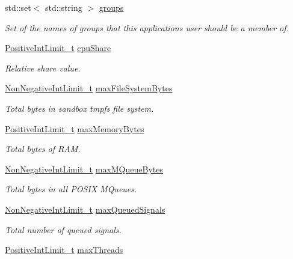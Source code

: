 \begin{DoxyCompactItemize}
std\+::set$<$ std\+::string $>$ \hyperlink{structmodel_1_1_app__t_a3267219b99e8c66bece84b38938f164a}{groups}
\begin{DoxyCompactList}\small\item\em Set of the names of groups that this application\textquotesingle{}s user should be a member of. \end{DoxyCompactList}\item 
\hyperlink{structmodel_1_1_positive_int_limit__t}{Positive\+Int\+Limit\+\_\+t} \hyperlink{structmodel_1_1_app__t_af94389e3a29da2287b80ecbdda222e15}{cpu\+Share}
\begin{DoxyCompactList}\small\item\em Relative share value. \end{DoxyCompactList}\item 
\hyperlink{classmodel_1_1_non_negative_int_limit__t}{Non\+Negative\+Int\+Limit\+\_\+t} \hyperlink{structmodel_1_1_app__t_a4f666df79c6d9ae53a7567ad42ccaccb}{max\+File\+System\+Bytes}
\begin{DoxyCompactList}\small\item\em Total bytes in sandbox tmpfs file system. \end{DoxyCompactList}\item 
\hyperlink{structmodel_1_1_positive_int_limit__t}{Positive\+Int\+Limit\+\_\+t} \hyperlink{structmodel_1_1_app__t_acaa1772da52e02302e30afb800eb24c1}{max\+Memory\+Bytes}
\begin{DoxyCompactList}\small\item\em Total bytes of R\+AM. \end{DoxyCompactList}\item 
\hyperlink{classmodel_1_1_non_negative_int_limit__t}{Non\+Negative\+Int\+Limit\+\_\+t} \hyperlink{structmodel_1_1_app__t_a0b1a34faf8e5b2d9e6432900a362b010}{max\+M\+Queue\+Bytes}
\begin{DoxyCompactList}\small\item\em Total bytes in all P\+O\+S\+IX M\+Queues. \end{DoxyCompactList}\item 
\hyperlink{classmodel_1_1_non_negative_int_limit__t}{Non\+Negative\+Int\+Limit\+\_\+t} \hyperlink{structmodel_1_1_app__t_a71135f9db3e810c42bfb582506d8f3a3}{max\+Queued\+Signals}
\begin{DoxyCompactList}\small\item\em Total number of queued signals. \end{DoxyCompactList}\item 
\hyperlink{structmodel_1_1_positive_int_limit__t}{Positive\+Int\+Limit\+\_\+t} \hyperlink{structmodel_1_1_app__t_aff53e95558038d4da482b6ac38a1a2f8}{max\+Threads}

\end{DoxyCompactItemize}
